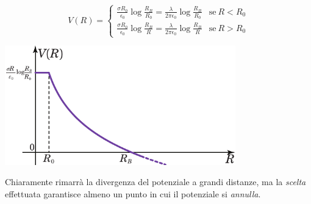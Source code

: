 \begin{equation}
	V(R)=
	\begin{cases}
		\frac{\sigma R_0}{\epsilon_0}\log \frac{R_B}{R_0}=\frac{\lambda}{2\pi\epsilon_0}\log \frac{R_B}{R_0}&\text{se}\ R< R_0\\
		\frac{\sigma R_0}{\epsilon_0}\log \frac{R_B}{R}=\frac{\lambda}{2\pi\epsilon_0}\log \frac{R_B}{R}&\text{se}\ R> R_0
	\end{cases}
\end{equation}
\begin{center}
	\includegraphics[width=0.75\textwidth]{images/chp3/chp3cilindrograf2.pdf}
\end{center}
Chiaramente rimarrà la divergenza del potenziale a grandi distanze, ma la \textit{scelta} effettuata garantisce almeno un punto in cui il potenziale si \textit{annulla}.
